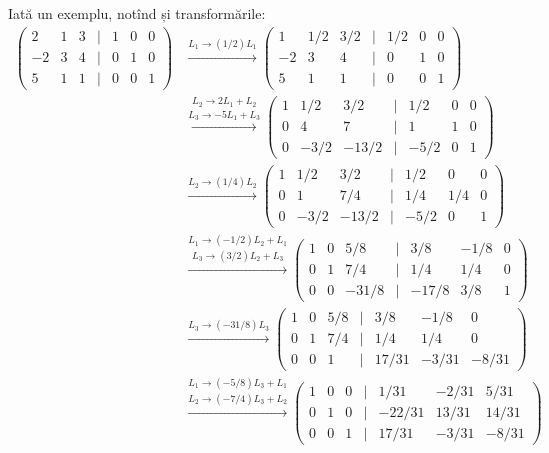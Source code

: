 Iată un exemplu, notînd și transformările:
\begin{align*}
  \begin{pmatrix}
    2 & 1 & 3 & \mid & 1 & 0 & 0 \\
    -2 & 3 & 4 & \mid & 0 & 1 & 0 \\
    5 & 1 & 1 & \mid & 0 & 0 & 1
  \end{pmatrix} &\xrightarrow{L_1 \to (1/2)L_1}
  \begin{pmatrix}
    1 & 1/2 & 3/2 & \mid & 1/2 & 0 & 0 \\
    -2 & 3 & 4 & \mid & 0 & 1 & 0 \\
    5 & 1 & 1 & \mid & 0 & 0 & 1 
  \end{pmatrix} \\
  &\stackrel{L_2 \to 2L_1 + L_2}{\xrightarrow{L_3 \to -5L_1 + L_3}}
  \begin{pmatrix}
    1 & 1/2 & 3/2 & \mid & 1/2 & 0 & 0 \\
    0 & 4 & 7 & \mid & 1 & 1 & 0 \\
    0 & -3/2 & -13/2 & \mid & -5/2 & 0 & 1
  \end{pmatrix} \\
  &\xrightarrow{L_2 \to (1/4)L_2}
  \begin{pmatrix}
    1 & 1/2 & 3/2 & \mid & 1/2 & 0 & 0 \\
    0 & 1 & 7/4 & \mid & 1/4 & 1/4 & 0 \\
    0 & -3/2 & -13/2 & \mid & -5/2 & 0 & 1 
  \end{pmatrix} \\
  &\stackrel{L_1 \to (-1/2)L_2 + L_1}{\xrightarrow{L_3 \to (3/2)L_2 + L_3}}
  \begin{pmatrix}
    1 & 0 & 5/8 & \mid & 3/8 & -1/8 & 0 \\
    0 & 1 & 7/4 & \mid & 1/4 & 1/4 & 0 \\
    0 & 0 & -31/8 & \mid & -17/8 & 3/8 & 1
  \end{pmatrix} \\
  &\xrightarrow{L_3 \to (-31/8)L_3}
  \begin{pmatrix}
    1 & 0 & 5/8 & \mid & 3/8 & -1/8 & 0 \\
    0 & 1 & 7/4 & \mid & 1/4 & 1/4 & 0 \\
    0 & 0 & 1 & \mid & 17/31 & -3/31 & -8/31
  \end{pmatrix} \\
  &\stackrel{L_1 \to (-5/8)L_3 + L_1}{\xrightarrow{L_2 \to (-7/4)L_3 + L_2}}
  \begin{pmatrix}
    1 & 0 & 0 & \mid & 1/31 & -2/31 & 5/31 \\
    0 & 1 & 0 & \mid & -22/31 & 13/31 & 14/31 \\
    0 & 0 & 1 & \mid & 17/31 & -3/31 & -8/31
  \end{pmatrix}
\end{align*}

